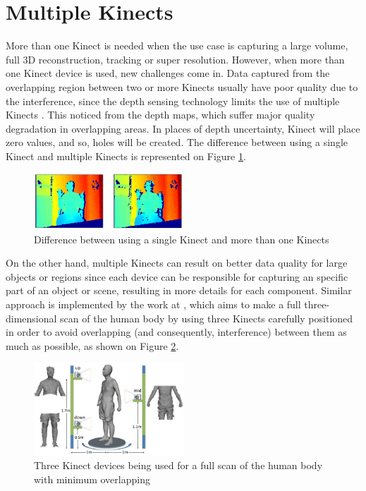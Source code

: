 \documentclass[msc, a4paper, classic, en]{ufbathesis}
\begin{document}
\section{Multiple Kinects}

More than one Kinect is needed when the use case is capturing a large volume, full 3D reconstruction, tracking or super resolution. 
However, when more than one Kinect device is used, new challenges come in. Data captured from the overlapping region between two or more Kinects usually have poor quality due to the interference, since the depth sensing technology limits the use of multiple Kinects \cite{roy}. This noticed from the depth maps, which suffer major quality degradation in overlapping areas. In places of depth uncertainty, Kinect will place zero values, and so, holes will be created. The difference between using a single Kinect and multiple Kinects is represented on Figure \ref{fig:twokin}. 

\begin{figure}
\label{fig:twokin}
\centering
\includegraphics[width=0.5\textwidth]{images/twokin.png}
\caption{Difference between using a single Kinect and more than one Kinects}
\end{figure}

On the other hand, multiple Kinects can result on better data quality for large objects or regions since each device can be responsible for capturing an specific part of an object or scene, resulting in more details for each component. Similar approach is implemented by the work at \cite{tong}, which aims to make a full three-dimensional scan of the human body by using three Kinects carefully positioned in order to avoid overlapping (and consequently, interference) between them as much as possible, as shown on Figure \ref{fig:3kin}.

\begin{figure}
\label{fig:3kin}
\centering
\includegraphics[width=0.5\textwidth]{images/3kin.jpg}
\caption{Three Kinect devices being used for a full scan of the human body with minimum overlapping \cite{tong}}
\end{figure}
\end{document}
